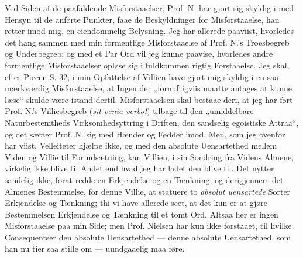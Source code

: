 \documentclass[12pt,a4paper]{book}
\newcommand{\opage}[1]{\marginnote{\footnotesize\textit{[#1]}}}
\begin{document}
Ved Siden af de paafaldende Misforstaaelser, Prof. N. har gjort sig skyldig i med
Hensyn til de anførte Punkter, faae de Beskyldninger for Misforstaaelse, han
retter imod mig, en eiendommelig Belysning. Jeg har allerede paaviist, hvorledes
det hang sammen med min formentlige Misforstaaelse af Prof. N.'s Troesbegreb og
Underbegreb; og med et Par Ord vil jeg kunne paavise, hvorledes andre formentlige
Misforstaaelser opløse sig i fuldkommen rigtig Forstaaelse. Jeg skal, efter
Piecen S. 32, i min Opfattelse af Villien have gjort mig skyldig i en saa
mærkværdig Misforstaaelse, at Ingen der „fornuftigviis maatte antages at kunne
læse“ skulde være istand dertil. Misforstaaelsen skal bestaae deri, at jeg har
ført Prof. N.'s Villiesbegreb (\textit{sit venia verbo!}) tilbage til den
„umiddelbare Naturbestemtheds Virksomhedsyttring i Driften, den sandselig
egoistiske Attraa“, og det sætter Prof. N. sig med Hænder og Fødder imod. Men,
som jeg ovenfor har viist, Velleiteter hjælpe ikke, og med den absolute
Uensartethed mellem Viden og Villie til For\-%
\opage{16}%
udsætning, kan Villien, i sin Sondring fra Videns Almene, virkelig ikke blive til
Andet end hvad jeg har ladet den blive til. Det nytter sandelig ikke, forat redde
en Erkjendelse og en Tænkning, og derigjennem det Almenes Bestemmelse, for denne
Villie, at statuere to \emph{absolut uensartede} Sorter Erkjendelse og Tænkning;
thi vi have allerede seet, at det kun er at gjøre Bestemmelsen Erkjendelse og
Tænkning til et tomt Ord. Altsaa her er ingen Misforstaaelse paa min Side; men
Prof. Nielsen har kun ikke forstaaet, til hvilke Consequentser den absolute
Uensartethed --- denne absolute Uensartethed, som han nu tier saa stille om ---
uundgaaelig maa føre.
\end{document}
